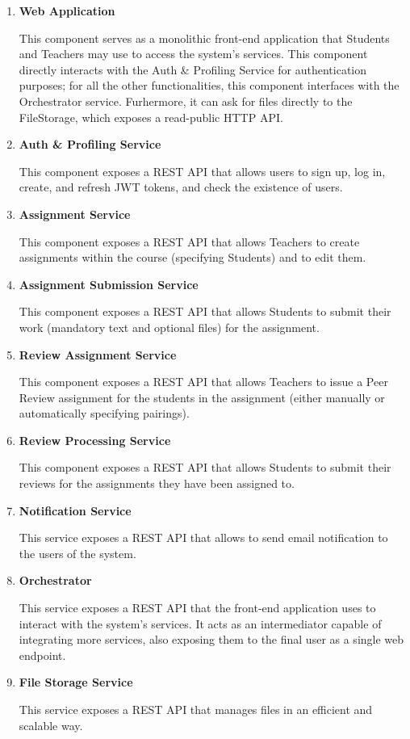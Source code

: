 \begin{enumerate}
    \item \textbf{Web Application}\label{def:WebApplication} 
    
    This component serves as a monolithic front-end application that Students and Teachers may use to access the system’s services. This component directly interacts with the Auth \& Profiling Service for authentication purposes; for all the other functionalities, this component interfaces with the Orchestrator service. Furhermore, it can ask for files directly to the FileStorage, which exposes a read-public HTTP API. 
    
    \item \textbf{Auth \& Profiling Service}\label{def:AuthProfilingService}
    
    This component exposes a REST API that allows users to sign up, log in, create, and refresh JWT tokens, and check the existence of users.
    \item \textbf{Assignment Service}\label{def:AssignmentService} 
    
    This component exposes a REST API that allows Teachers to create assignments within the course (specifying Students) and to edit them.
    \item \textbf{Assignment Submission Service}\label{def:AssignmentSubmissionService} 
    
    This component exposes a REST API that allows Students to submit their work (mandatory text and optional files) for the assignment.
    \item \textbf{Review Assignment Service}\label{def:ReviewAssignmentService} 
    
    This component exposes a REST API that allows Teachers to issue a Peer Review assignment for the students in the assignment (either manually or automatically specifying pairings).
    \item \textbf{Review Processing Service}\label{def:ReviewProcessingService} 
    
    This component exposes a REST API that allows Students to submit their reviews for the assignments they have been assigned to.
    \item \textbf{Notification Service}\label{def:NotificationService} 
    
    This service exposes a REST API that allows to send email notification to the users of the system.
    \item \textbf{Orchestrator}\label{def:Orchestrator} 
    
    This service exposes a REST API that the front-end application uses to interact with the system’s services. It acts as an intermediator capable of integrating more services, also exposing them to the final user as a single web endpoint.
    \item \textbf{File Storage Service}\label{def:FileStorageService} 
    
    This service exposes a REST API that manages files in an efficient and scalable way.
\end{enumerate}
